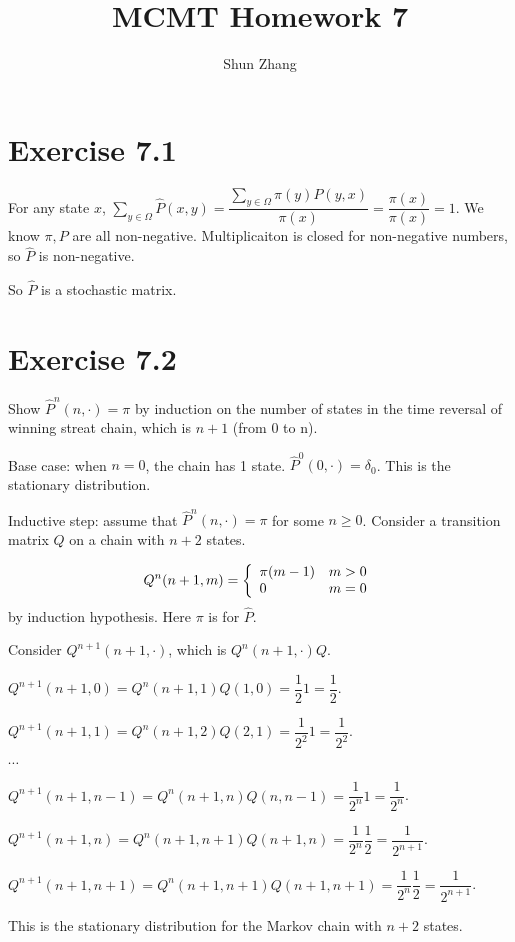 \documentclass[10pt]{article}
\title{MCMT Homework 7}
\author{Shun Zhang}
\date{}
\begin{document}
\maketitle

\section*{Exercise 7.1}

For any state $x$, 
$\sum_{y \in \Omega} \hat{P}(x, y)
= \dfrac{\sum_{y \in \Omega} \pi(y) P(y, x)}{\pi(x)}
= \dfrac{\pi(x)}{\pi(x)}
= 1
$.
We know $\pi, P$ are all non-negative. Multiplicaiton is closed for non-negative
numbers, so $\hat{P}$ is non-negative.

So $\hat{P}$ is a stochastic matrix.

\section*{Exercise 7.2}

Show $\hat{P}^n (n, \cdot) = \pi$ by induction on the number of states in the
time reversal of winning streat chain, which is $n+1$ (from 0 to n).

Base case: when $n = 0$, the chain has 1 state. $\hat{P}^0 (0, \cdot) =
\delta_0$. This is the stationary distribution.

Inductive step: assume that $\hat{P}^n (n, \cdot) = \pi$ for some $n \geq 0$.
Consider a transition matrix $Q$ on a chain with $n+2$ states.
 
$$Q^n(n+1, m) = \left\{
\begin{array}{l l}
\pi(m - 1) & m > 0 \\
0 & m = 0
\end{array}
\right.
$$
by induction hypothesis. Here $\pi$ is for $\hat{P}$.

Consider $Q^{n+1}(n+1, \cdot)$, which is $Q^{n}(n+1, \cdot) Q$.

$Q^{n+1}(n+1, 0) = Q^{n}(n+1, 1) Q(1, 0) = \dfrac{1}{2} 1 = \dfrac{1}{2}$.

$Q^{n+1}(n+1, 1) = Q^{n}(n+1, 2) Q(2, 1) = \dfrac{1}{2^2} 1 = \dfrac{1}{2^2}$.

$\cdots$

$Q^{n+1}(n+1, n-1) = Q^{n}(n+1, n) Q(n, n - 1) = \dfrac{1}{2^n} 1 =
\dfrac{1}{2^{n}}$.

$Q^{n+1}(n+1, n) = Q^{n}(n+1, n+1) Q(n+1, n) = \dfrac{1}{2^n} \dfrac{1}{2} =
\dfrac{1}{2^{n+1}}$.

$Q^{n+1}(n+1, n+1) = Q^{n}(n+1, n+1) Q(n+1, n+1) = \dfrac{1}{2^{n}} \dfrac{1}{2}
= \dfrac{1}{2^{n+1}}$.

This is the stationary distribution for the Markov chain with $n+2$ states.
\end{document}
